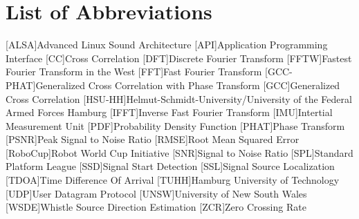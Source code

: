 \chapter*{List of Abbreviations}
\label{sec:abbreviations}

\begin{acronym}\itemsep0pt
  [ALSA]{Advanced Linux Sound Architecture}
  [API]{Application Programming Interface}
  [CC]{Cross Correlation}
  [DFT]{Discrete Fourier Transform}
  [FFTW]{Fastest Fourier Transform in the West}
  [FFT]{Fast Fourier Transform}
  [GCC-PHAT]{Generalized Cross Correlation with Phase Transform}
  [GCC]{Generalized Cross Correlation}
  [HSU-HH]{Helmut-Schmidt-University/University of the Federal Armed Forces Hamburg}
  [IFFT]{Inverse Fast Fourier Transform}
  [IMU]{Intertial Measurement Unit}
  [PDF]{Probability Density Function}
  [PHAT]{Phase Transform}
  [PSNR]{Peak Signal to Noise Ratio}
  [RMSE]{Root Mean Squared Error}
  [RoboCup]{Robot World Cup Initiative}
  [SNR]{Signal to Noise Ratio}
  [SPL]{Standard Platform League}
  [SSD]{Signal Start Detection}
  [SSL]{Signal Source Localization}
  [TDOA]{Time Difference Of Arrival}
  [TUHH]{Hamburg University of Technology}
  [UDP]{User Datagram Protocol}
  [UNSW]{University of New South Wales}
  [WSDE]{Whistle Source Direction Estimation}
  [ZCR]{Zero Crossing Rate}
\end{acronym}
